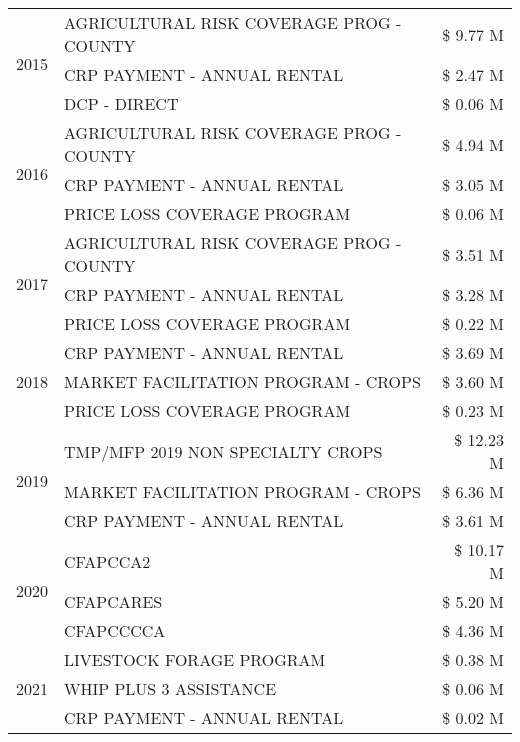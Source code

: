\begin{tabular}{llr}
\cline{1-3}
\multirow[t]{3}{*}{2015} & AGRICULTURAL RISK COVERAGE PROG - COUNTY & \$ 9.77 M \\
 & CRP PAYMENT - ANNUAL RENTAL & \$ 2.47 M \\
 & DCP - DIRECT & \$ 0.06 M \\
\cline{1-3}
\multirow[t]{3}{*}{2016} & AGRICULTURAL RISK COVERAGE PROG - COUNTY & \$ 4.94 M \\
 & CRP PAYMENT - ANNUAL RENTAL & \$ 3.05 M \\
 & PRICE LOSS COVERAGE PROGRAM & \$ 0.06 M \\
\cline{1-3}
\multirow[t]{3}{*}{2017} & AGRICULTURAL RISK COVERAGE PROG - COUNTY & \$ 3.51 M \\
 & CRP PAYMENT - ANNUAL RENTAL & \$ 3.28 M \\
 & PRICE LOSS COVERAGE PROGRAM & \$ 0.22 M \\
\cline{1-3}
\multirow[t]{3}{*}{2018} & CRP PAYMENT - ANNUAL RENTAL & \$ 3.69 M \\
 & MARKET FACILITATION PROGRAM - CROPS & \$ 3.60 M \\
 & PRICE LOSS COVERAGE PROGRAM & \$ 0.23 M \\
\cline{1-3}
\multirow[t]{3}{*}{2019} & TMP/MFP 2019 NON SPECIALTY CROPS & \$ 12.23 M \\
 & MARKET FACILITATION PROGRAM - CROPS & \$ 6.36 M \\
 & CRP PAYMENT - ANNUAL RENTAL & \$ 3.61 M \\
\cline{1-3}
\multirow[t]{3}{*}{2020} & CFAPCCA2 & \$ 10.17 M \\
 & CFAPCARES & \$ 5.20 M \\
 & CFAPCCCCA & \$ 4.36 M \\
\cline{1-3}
\multirow[t]{3}{*}{2021} & LIVESTOCK FORAGE PROGRAM & \$ 0.38 M \\
 & WHIP PLUS 3 ASSISTANCE & \$ 0.06 M \\
 & CRP PAYMENT - ANNUAL RENTAL & \$ 0.02 M \\
\cline{1-3}
\bottomrule
\end{tabular}

